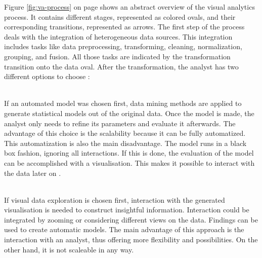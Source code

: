 Figure \ref{fig:va-process} on page \pageref{fig:va-process} shows an abstract overview of the visual analytics process. It contains different stages, represented as colored ovals, and their corresponding transitions, represented as arrows. The first step of the process deals with the integration of heterogeneous data sources. This integration includes tasks like data preprocessing, transforming, cleaning, normalization, grouping, and fusion. All those tasks are indicated by the transformation transition onto the data oval. After the transformation, the analyst has two different options to choose :

\begin{enumerate}
 \hfill \\
If an automated model was chosen first, data mining methods are applied to generate statistical models out of the original data. Once the model is made, the analyst only needs to refine its parameters and evaluate it afterwards. The advantage of this choice is the scalability because it can be fully automatized. This automatization is also the main disadvantage. The model runs in a black box fashion, ignoring all interactions. If this is done, the evaluation of the model can be accomplished with a visualisation. This makes it possible to interact with the data later on .

 \hfill \\
If visual data exploration is chosen first, interaction with the generated visualisation is needed to construct insightful information. Interaction could be integrated by zooming or considering different views on the data. Findings can be used to create automatic models. The main advantage of this approach is the interaction with an analyst, thus offering more flexibility and possibilities. On the other hand, it is not scaleable in any way.
\end{enumerate}


